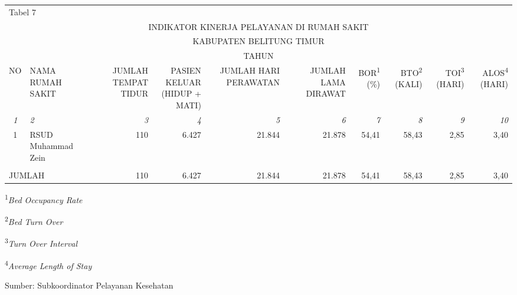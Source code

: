 {}

{\centering %
\begin{tabular}{clrrrrrrrr}
	\multicolumn{10}{l}{Tabel 7}\\
	\multicolumn{10}{c}{INDIKATOR KINERJA PELAYANAN DI RUMAH SAKIT}\\
	\multicolumn{10}{c}{KABUPATEN BELITUNG TIMUR}\\
	\multicolumn{10}{c}{TAHUN \tP}\\
	\toprule
	\multicolumn{1}{c}{NO} & \multicolumn{1}{l}{NAMA RUMAH SAKIT} & \multicolumn{1}{r}{\parbox{2.5cm}{\raggedleft JUMLAH TEMPAT TIDUR}} & \multicolumn{1}{r}{\parbox{2.5cm}{\raggedleft PASIEN KELUAR \\(HIDUP + MATI)}} & \multicolumn{1}{r}{\parbox{3cm}{\raggedleft JUMLAH HARI PERAWATAN}} & \multicolumn{1}{r}{\parbox{3cm}{\raggedleft JUMLAH LAMA DIRAWAT}} & \multicolumn{1}{r}{BOR\textsuperscript{1} (\%)} & \multicolumn{1}{r}{BTO\textsuperscript{2} (KALI)} & \multicolumn{1}{r}{TOI\textsuperscript{3} (HARI)} & \multicolumn{1}{r}{ALOS\textsuperscript{4} (HARI)} \\
	\midrule
	\emph{1} & \emph{2} & \emph{3} & \emph{4} & \emph{5} & \emph{6} & \emph{7} & \emph{8} & \emph{9} & \emph{10}\\
	\midrule
	1 & RSUD Muhammad Zein     & 110 & 6.427 & 21.844 & 21.878 & 54,41 & 58,43 & 2,85 & 3,40 \\
	& & & & & & & & &  \\
	\midrule
	\multicolumn{2}{l}{JUMLAH} & 110 & 6.427 & 21.844 & 21.878 & 54,41 & 58,43 & 2,85 & 3,40 \\
	\bottomrule
\end{tabular}%

}

\vspace{2ex}
{\small
\textsuperscript{1}\emph{Bed Occupancy Rate}

\textsuperscript{2}\emph{Bed Turn Over}

\textsuperscript{3}\emph{Turn Over Interval}

\textsuperscript{4}\emph{Average Length of Stay}

}

\vfill
Sumber: Subkoordinator Pelayanan Kesehatan\par